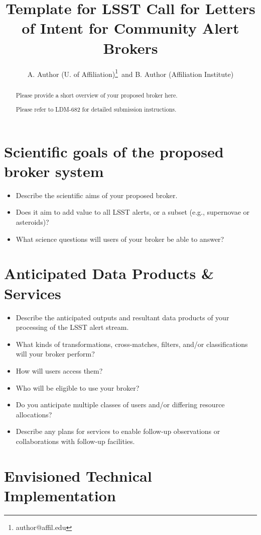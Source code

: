 \documentclass[11pt, letterpaper]{article}
\title{Template for LSST Call for Letters of Intent for Community Alert Brokers}
\author{A. Author (U. of Affiliation)\footnote{author@affil.edu}\ and B. Author (Affiliation Institute)}
\date{}
\begin{document}
\maketitle

\begin{abstract}
Please provide a short overview of your proposed broker here.

Please refer to LDM-682 for detailed submission instructions.
\end{abstract}


\section{Scientific goals of the proposed broker system}

\begin{itemize}
\item Describe the scientific aims of your proposed broker. 
\item Does it aim to add value to all LSST alerts, or a subset (e.g., supernovae or asteroids)?
\item What science questions will users of your broker be able to answer?
\end{itemize}


\section{Anticipated Data Products \& Services}

\begin{itemize}
\item Describe the anticipated outputs and resultant data products of your processing of the LSST alert stream. 
\item What kinds of transformations, cross-matches, filters, and/or classifications will your broker perform?
\item How will users access them?
\item Who will be eligible to use your broker?
\item Do you anticipate multiple classes of users and/or differing resource allocations?
\item Describe any plans for services to enable follow-up observations or collaborations with follow-up facilities.
\end{itemize}



\section{Envisioned Technical Implementation}
\end{document}
